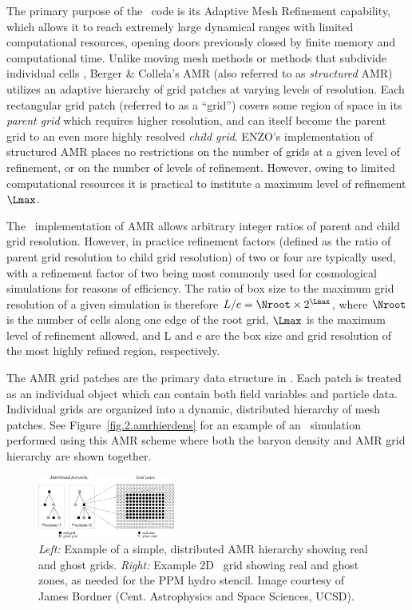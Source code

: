 The primary purpose of the \enzo\ code is its Adaptive Mesh Refinement
capability, which allows it to reach extremely large dynamical ranges
with limited computational resources, opening doors previously closed
by finite memory and computational time. Unlike moving mesh methods
\citep{1995ApJS..100..269P,1995ApJS...97..231G} or  
methods that subdivide 
individual cells \citep{Adjerid}, Berger \& Collela's AMR (also referred 
to as \emph{structured} AMR) utilizes an adaptive hierarchy of grid 
patches at varying levels of resolution.  Each rectangular grid patch 
(referred to as a ``grid'') covers some region of space in its 
\emph{parent grid} which requires higher resolution, and can itself 
become the parent grid to an even more highly resolved \emph{child grid}. 
ENZO's implementation of structured AMR places no restrictions on 
the number of grids at a given level of refinement, or on the number of 
levels of refinement.  However, owing to limited computational resources 
it is practical to institute a maximum level of refinement $\Lmax$.  

The \enzo\ implementation of AMR allows arbitrary integer ratios of parent and
child grid resolution.  However, in practice 
refinement factors (defined as the ratio of parent grid resolution to child grid resolution) 
of two or four are typically used, with a refinement factor
of two being most commonly used for cosmological simulations for reasons of
efficiency. The ratio of
box size to the maximum grid resolution of a given simulation is
therefore $L/e = \Nroot \times 2^{\Lmax}$, where $\Nroot$ is the
number of cells along one edge of the root grid, $\Lmax$ is the
maximum level of refinement allowed, and L and e are the box size
and grid resolution of the most highly refined region, respectively.

The AMR grid patches are the primary data structure in \enzo.  Each
patch is treated as an individual object which can contain both field
variables and particle data.  Individual grids are organized into a 
dynamic, distributed hierarchy of mesh patches.  
See 
Figure~\ref{fig.2.amrhierdens} for an example of an \enzo\
simulation performed using this AMR scheme where both the baryon density
and AMR grid hierarchy are shown together. 

\begin{figure}
\begin{center}
\includegraphics[width=0.4\textwidth]{figures/amr_hierarchy.eps}
\end{center}
\caption{\emph{Left:}  Example of a simple, 
distributed AMR hierarchy showing real and 
ghost grids.
\emph{Right:}  Example 2D \enzo\ grid showing real and ghost zones, as 
needed for the PPM hydro stencil.  Image courtesy of James Bordner (Cent.
Astrophysics and Space Sciences, UCSD).
}
\label{fig.2.amrhierarchy}
\end{figure}


